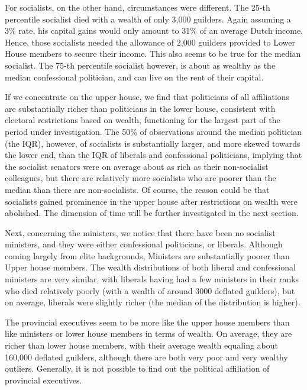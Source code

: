     For socialists, on the other hand, circumstances were different. The 25-th percentile socialist died with a wealth of only 3,000 guilders. Again assuming a 3\% rate, his capital gains would only amount to 31\% of an average Dutch income. Hence, those socialists needed the allowance of 2,000 guilders provided to Lower House members to secure their income.\autocite{van1983toegang} This also seems to be true for the median socialist. The 75-th percentile socialist however, is about as wealthy as the median confessional politician, and can live on the rent of their capital. 
    
    If we concentrate on the upper house, we find that politicians of all affiliations are substantially richer than politicians in the lower house, consistent with electoral restrictions based on wealth, functioning for the largest part of the period under investigation. \autocite{moes1994lijsten} The 50\% of observations around the median politician (the IQR), however, of socialists is substantially larger, and more skewed towards the lower end, than the IQR of liberals and confessional politicians, implying that the socialist senators were on average about as rich as their non-socialist colleagues, but there are relatively more socialists who are poorer than the median than there are non-socialists. Of course, the reason could be that socialists gained prominence in the upper house after restrictions on wealth were abolished. The dimension of time will be further investigated in the next section. 
    
    Next, concerning the ministers, we notice that there have been no socialist ministers, and they were either confessional politicians, or liberals. Although coming largely from elite backgrounds, Ministers are substantially poorer than Upper house members.\autocite{secker1991ministers} The wealth distributions of both liberal and confessional ministers are very similar, with liberals having had a few ministers in their ranks who died relatively poorly (with a wealth of around 3000 deflated guilders), but on average, liberals were slightly richer (the median of the distribution is higher). 
    
    The provincial executives seem to be more like the upper house members than like ministers or lower house members in terms of wealth. On average, they are richer than lower house members, with their average wealth equaling about 160,000 deflated guilders, although there are both very poor and very wealthy outliers. Generally, it is not possible to find out the political affiliation of provincial executives. 
    
